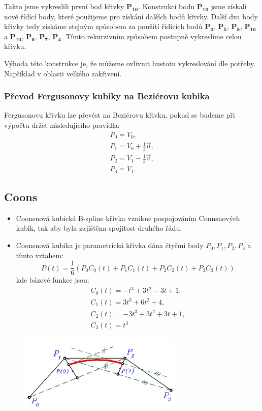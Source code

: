 Takto jsme vykreslili první bod křivky $\mathbf{P_10}$. Konstrukcí bodu $\mathbf{P_10}$ jsme získali nové řídící body, které použijeme pro získání dalších bodů křivky. Další dva body křivky tedy získáme stejným způsobem za použití řídících bodů {$\mathbf{P_0}$, $\mathbf{P_5}$, $\mathbf{P_8}$, $\mathbf{P_10}$} a {$\mathbf{P_10}$, $\mathbf{P_9}$, $\mathbf{P_7}$, $\mathbf{P_4}$}. Tímto rekurzivním způsobem postupně vykreslíme celou křivku.

Výhoda této konstrukce je, že můžeme ovlivnit hustotu vykreslování dle potřeby. Například v oblasti velkého zakřivení.

\subsubsection*{Převod Fergusonovy kubiky na Beziérovu kubika}
Fergusonovu křivku lze převést na Beziérovu křivku, pokud se budeme při výpočtu držet následujícího pravidla:
	\begin{equation*} 
	\begin{array}{c}
	P_0 = V_0,\\
	P_1 = V_0 + \frac{1}{3}\vec{u},\\
	P_2 = V_1 − \frac{1}{3}\vec{v},\\
	P_3 = V_1.
	\end{array}
	\end{equation*}


\subsection{Coons}
\begin{itemize}
	\item Coonsnová kubická B-spline křivka vznikne pospojováním Connsnových kubik, tak aby byla zajištěna spojitost druhého řádu.
	\item Coonsnová kubika je parametrická křivka dána čtyřmi body $P_0, P_1, P_2, P_3$ a tímto vztahem:
		\begin{equation*} 
			P(t) = \frac{1}{6} (P_0C_0(t) + P_1C_1(t) + P_2C_2(t) + P_3C_3(t))
		\end{equation*}
		kde bázové funkce jsou:
		\begin{equation*} 
		\begin{array}{c}
			C_0(t) = -t^3 + 3t^2 - 3t + 1, \\
			C_1(t) = 3t^3 + 6t^2 + 4, \\
			C_2(t) = -3t^3 + 3t^2 + 3t + 1, \\
			C_3(t) = t^3
		\end{array}		
		\end{equation*}
\end{itemize}
\begin{figure}[H]
\centering
\includegraphics[width=0.7\textwidth]{assets/2_coons-b-spline}
\end{figure}
